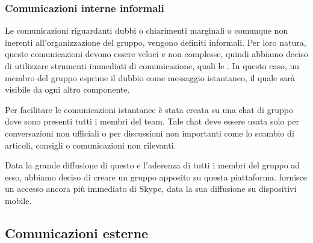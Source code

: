\subsubsection{Comunicazioni interne informali}
Le comunicazioni riguardanti dubbi o chiarimenti marginali o comunque non inerenti all'organizzazione del gruppo, vengono definiti informali. Per loro natura, queste comunicazioni devono essere veloci e non complesse, quindi abbiamo deciso di utilizzare strumenti immediati di comunicazione, quali le . In questo caso, un membro del gruppo esprime il dubbio come messaggio istantaneo, il quale sarà visibile da ogni altro componente. 

\label{3.2.1}
Per facilitare le comunicazioni istantanee è stata creata su  una chat di gruppo dove sono presenti tutti i membri del team. Tale chat deve essere usata solo per conversazioni non ufficiali o per discussioni non importanti come lo scambio di articoli, consigli o comunicazioni non rilevanti.

Data la grande diffusione di questo  e l'aderenza di tutti i membri del gruppo ad esso, abbiamo deciso di creare un gruppo apposito su questa piattaforma.  fornisce un accesso ancora più immediato di Skype, data la sua diffusione su dispositivi mobile.  

\subsection{Comunicazioni esterne}

